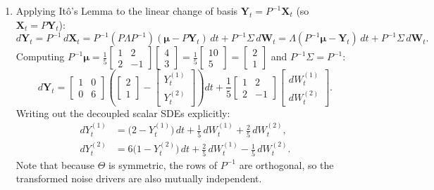 \documentclass[11pt, letterpaper]{article}
\theoremstyle{definition}
\theoremstyle{remark}
\begin{document}
\begin{enumerate}[label=(\alph*)]
    \item Applying It\^{o}'s Lemma to the linear change of basis $\mathbf{Y}_{t} = P^{-1}\mathbf{X}_{t}$ (so $\mathbf{X}_{t} = P\mathbf{Y}_{t}$):
    \[
    d\mathbf{Y}_{t} = P^{-1}\,d\mathbf{X}_{t} = P^{-1}(P\Lambda P^{-1})(\boldsymbol{\mu} - P\mathbf{Y}_{t})\,dt + P^{-1}\Sigma\,d\mathbf{W}_{t} = \Lambda(P^{-1}\boldsymbol{\mu} - \mathbf{Y}_{t})\,dt + P^{-1}\Sigma\,d\mathbf{W}_{t}.
    \]
    Computing $P^{-1}\boldsymbol{\mu} = \frac{1}{5}\begin{bmatrix} 1 & 2 \\ 2 & -1 \end{bmatrix}\begin{bmatrix} 4 \\ 3 \end{bmatrix} = \frac{1}{5}\begin{bmatrix} 10 \\ 5 \end{bmatrix} = \begin{bmatrix} 2 \\ 1 \end{bmatrix}$ and $P^{-1}\Sigma = P^{-1}$:
    \[
    d\mathbf{Y}_{t} = \begin{bmatrix} 1 & 0 \\ 0 & 6 \end{bmatrix}\left(\begin{bmatrix} 2 \\ 1 \end{bmatrix} - \begin{bmatrix} Y_{t}^{(1)} \\ Y_{t}^{(2)} \end{bmatrix}\right)dt + \frac{1}{5}\begin{bmatrix} 1 & 2 \\ 2 & -1 \end{bmatrix}\begin{bmatrix} dW_{t}^{(1)} \\ dW_{t}^{(2)} \end{bmatrix}.
    \]
    Writing out the decoupled scalar SDEs explicitly:
    \begin{align*}
    dY_{t}^{(1)} &= \bigl(2 - Y_{t}^{(1)}\bigr)\,dt + \frac{1}{5}\,dW_{t}^{(1)} + \frac{2}{5}\,dW_{t}^{(2)}, \\
    dY_{t}^{(2)} &= 6\bigl(1 - Y_{t}^{(2)}\bigr)\,dt + \frac{2}{5}\,dW_{t}^{(1)} - \frac{1}{5}\,dW_{t}^{(2)}.
    \end{align*}
    Note that because $\Theta$ is symmetric, the rows of $P^{-1}$ are orthogonal, so the transformed noise drivers are also mutually independent.


\end{enumerate}
\end{document}
